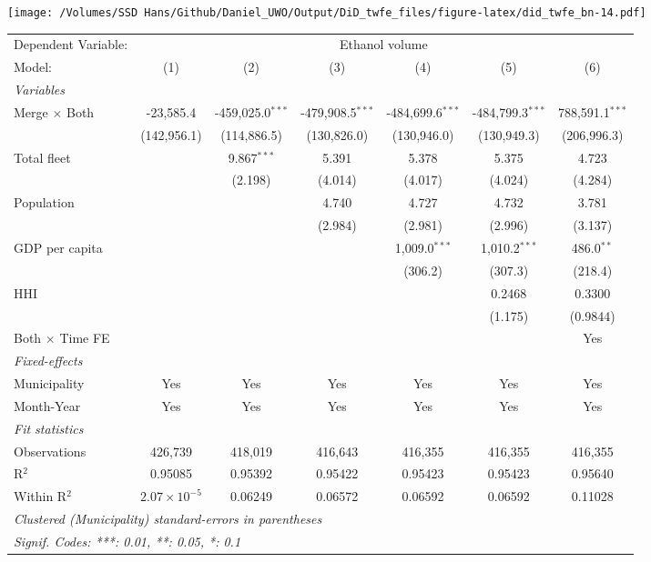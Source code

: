 \documentclass[
]{article}
\begin{document}
\texttt{[image: /Volumes/SSD Hans/Github/Daniel\_UWO/Output/DiD\_twfe\_files/figure-latex/did\_twfe\_bn-14.pdf]}

\begin{tabular}{lcccccc}
\tabularnewline\midrule\midrule
Dependent Variable:&\multicolumn{6}{c}{Ethanol volume}\\
Model:&(1) & (2) & (3) & (4) & (5) & (6)\\
\midrule \emph{Variables}&   &   &   &   &   &  \\
Merge $\times $ Both & -23,585.4 & -459,025.0$^{***}$ & -479,908.5$^{***}$ & -484,699.6$^{***}$ & -484,799.3$^{***}$ & 788,591.1$^{***}$\\
  &(142,956.1) & (114,886.5) & (130,826.0) & (130,946.0) & (130,949.3) & (206,996.3)\\
Total fleet &    & 9.867$^{***}$ & 5.391 & 5.378 & 5.375 & 4.723\\
  &   & (2.198) & (4.014) & (4.017) & (4.024) & (4.284)\\
Population &    &    & 4.740 & 4.727 & 4.732 & 3.781\\
  &   &    & (2.984) & (2.981) & (2.996) & (3.137)\\
GDP per capita &    &    &    & 1,009.0$^{***}$ & 1,010.2$^{***}$ & 486.0$^{**}$\\
  &   &    &    & (306.2) & (307.3) & (218.4)\\
HHI &    &    &    &    & 0.2468 & 0.3300\\
  &   &    &    &    & (1.175) & (0.9844)\\
Both $\times$ Time FE &  &  &  &  &  & Yes\\
\midrule \emph{Fixed-effects}&   &   &   &   &   &  \\
Municipality & Yes & Yes & Yes & Yes & Yes & Yes\\
Month-Year & Yes & Yes & Yes & Yes & Yes & Yes\\
\midrule \emph{Fit statistics}&  & & & & & \\
Observations & 426,739&418,019&416,643&416,355&416,355&416,355\\
R$^2$ & 0.95085&0.95392&0.95422&0.95423&0.95423&0.95640\\
Within R$^2$ & $2.07\times 10^{-5}$&0.06249&0.06572&0.06592&0.06592&0.11028\\
\midrule\midrule\multicolumn{7}{l}{\emph{Clustered (Municipality) standard-errors in parentheses}}\\
\multicolumn{7}{l}{\emph{Signif. Codes: ***: 0.01, **: 0.05, *: 0.1}}\\
\end{tabular}
\end{document}
